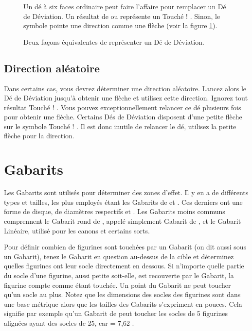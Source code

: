 \begin{figure}[!htbp]
\begin{minipage}[c]{0.67\textwidth}
\vspace*{10pt}
\subsubsection{}

Un dé à six faces ordinaire peut faire l'affaire pour remplacer un Dé de Déviation. Un résultat de  ou  représente un \og Touché ! \fg . Sinon, le symbole  pointe une direction comme une flèche (voir la figure \ref{figure/deviation_dice}).

\caption{Deux façons équivalentes de représenter un Dé de Déviation.}
\label{figure/deviation_dice}
\end{minipage}
\end{figure}

\subsection{Direction aléatoire}

Dans certains cas, vous devrez déterminer une direction aléatoire. Lancez alors le Dé de Déviation jusqu'à obtenir une flèche et utilisez cette direction. Ignorez tout résultat \og Touché ! \fg{}. Vous pouvez exceptionnellement relancer ce dé plusieurs fois pour obtenir une flèche. Certains Dés de Déviation disposent d'une petite flèche sur le symbole \og Touché ! \fg{}. Il est donc inutile de relancer le dé, utilisez la petite flèche pour la direction.

\section{Gabarits}

Les Gabarits sont utilisés pour déterminer des zones d'effet. Il y en a de différents types et tailles, les plus employés étant les Gabarits de  et . Ces derniers ont une forme de disque, de diamètres respectifs  et . Les Gabarits moins communs comprennent le Gabarit rond de , appelé simplement Gabarit de , et le Gabarit Linéaire, utilisé pour les canons et certains sorts.

Pour définir combien de figurines sont touchées par un Gabarit (on dit aussi sous un Gabarit), tenez le Gabarit en question au-dessus de la cible et déterminez quelles figurines ont leur socle directement en dessous. Si n'importe quelle partie du socle d'une figurine, aussi petite soit-elle, est recouverte par le Gabarit, la figurine compte comme étant touchée. Un point du Gabarit ne peut toucher qu'un socle au plus. Notez que les dimensions des socles des figurines sont dans une base métrique alors que les tailles des Gabarits s'expriment en pouces. Cela signifie par exemple qu'un Gabarit de  peut toucher les socles de 5 figurines alignées ayant des socles de \unit{25}{\milli\meter}, car  = 7,62 {\centi\meter}.

